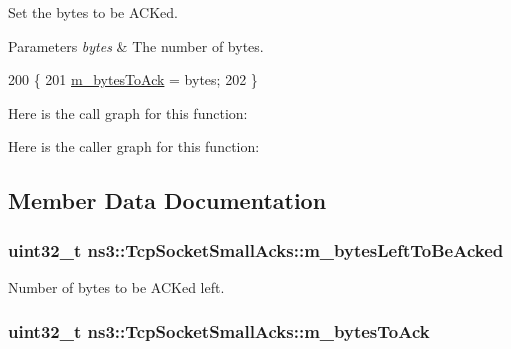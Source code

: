 Set the bytes to be A\+C\+Ked. 


\begin{DoxyParams}{Parameters}
{\em bytes} & The number of bytes. \\
\hline
\end{DoxyParams}

\begin{DoxyCode}
200   \{
201     \hyperlink{classns3_1_1TcpSocketSmallAcks_a936e4af4cfc9c1f108511c65cfe675be}{m\_bytesToAck} = bytes;
202   \}
\end{DoxyCode}


Here is the call graph for this function\+:




Here is the caller graph for this function\+:




\subsection{Member Data Documentation}
\subsubsection[{\texorpdfstring{m\+\_\+bytes\+Left\+To\+Be\+Acked}{m_bytesLeftToBeAcked}}]{\setlength{\rightskip}{0pt plus 5cm}uint32\+\_\+t ns3\+::\+Tcp\+Socket\+Small\+Acks\+::m\+\_\+bytes\+Left\+To\+Be\+Acked\hspace{0.3cm}{\ttfamily [protected]}}\hypertarget{classns3_1_1TcpSocketSmallAcks_ad2e2f67059d57638e853931260d60a77}{}\label{classns3_1_1TcpSocketSmallAcks_ad2e2f67059d57638e853931260d60a77}


Number of bytes to be A\+C\+Ked left. 

\subsubsection[{\texorpdfstring{m\+\_\+bytes\+To\+Ack}{m_bytesToAck}}]{\setlength{\rightskip}{0pt plus 5cm}uint32\+\_\+t ns3\+::\+Tcp\+Socket\+Small\+Acks\+::m\+\_\+bytes\+To\+Ack\hspace{0.3cm}{\ttfamily [protected]}}\hypertarget{classns3_1_1TcpSocketSmallAcks_a936e4af4cfc9c1f108511c65cfe675be}{}\label{classns3_1_1TcpSocketSmallAcks_a936e4af4cfc9c1f108511c65cfe675be}


